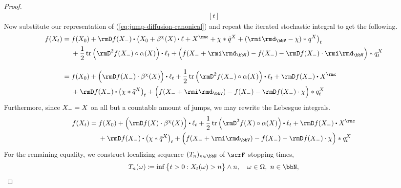 \begin{proof}
\begin{equation*}
\begin{aligned}[t]
    \end{aligned}
  \end{equation*}
  Now substitute our representation of (\ref{eq:jump-diffusion-canonical}) and repeat the iterated stochastic integral to get the following.
  \begin{align*}
    f(\X_t)
    &= \begin{aligned}[t]
      &f(\X_0) + \Der f(\X_-) \shortInt \big( \X_0 + \affDrift^\trunc(\X) \shortInt \leb + \X^\rmc + \trunc \ast \compensate{\jumpMeas^\X} + (\id_\vecSpace-\trunc) \ast \jumpMeas^\X \big)_t \\
      &+ \frac12 \tr\Big( \Hess f(\X_-) \circ \affDiff(\X) \Big)  \shortInt \leb_t  + \Big( f(\X_-+\id_\vecSpace) - f(\X_-) - \Der f(\X_-) \cdot \id_\vecSpace \Big) \ast \jumpMeas^\X_t
    \end{aligned} \\[1em]
    &= \begin{aligned}[t]
      &f(\X_0) + \Big( \Der f(\X_-) \cdot \affDrift^\trunc(\X) \Big) \shortInt \leb_t + \frac12 \tr\Big( \Hess f(\X_-) \circ \affDiff(\X) \Big)  \shortInt \leb_t + \Der f(\X_-) \shortInt \X^\rmc \\
      &+ \Der f(\X_-) \shortInt \big( \trunc \ast \compensate{\jumpMeas^\X} \big)_t + \Big( f(\X_-+\id_\vecSpace) - f(\X_-) - \Der f(\X_-) \cdot \trunc \Big) \ast \jumpMeas^\X_t
    \end{aligned}
  \end{align*}
  Furthermore, since $X_- = X$ on all but a countable amount of jumps, we may rewrite the Lebesgue integrals.
  \begin{equation}
    \label{eq:ito-pause}
    f(\X_t)
    = \begin{aligned}[t]
      &f(\X_0) + \Big( \Der f(\X) \cdot \affDrift^\trunc(\X) \Big) \shortInt \leb_t + \frac12 \tr\Big( \Hess f(\X) \circ \affDiff(\X) \Big)  \shortInt \leb_t + \Der f(\X_-) \shortInt \X^\rmc \\
      &+ \Der f(\X_-) \shortInt \big( \trunc \ast \compensate{\jumpMeas^\X} \big)_t + \Big( f(\X_-+\id_\vecSpace) - f(\X_-) - \Der f(\X_-) \cdot \trunc \Big) \ast \jumpMeas^\X_t
    \end{aligned}
  \end{equation}
  For the remaining equality, we construct localizing sequence $(T_n)_{n\in\bbN}$ of $\scrF$ stopping times,
  \begin{equation}
    \label{eq:stopping-times}
    T_n(\omega) \defeq \inf \big\{ t > 0 : \X_t(\omega) > n \big\} \wedge n, \quad \omega \in \Omega, ~ n \in \bbN,

\end{equation}
\end{proof}

